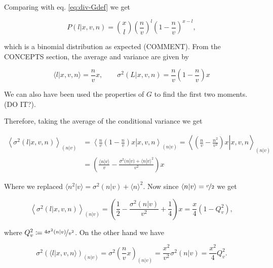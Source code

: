 Comparing with eq. \eqref{eq:div-Gdef} we get

\begin{equation}
  P(l|x,v,n) = {x\choose l}\left(\frac{n}{v}\right)^l\left(1-\frac{n}{v}\right)^{x-l},
\end{equation}

which is a binomial distribution as expected (COMMENT). From the CONCEPTS section, the average and variance are given by

\begin{equation}
  \langle l|x,v,n\rangle = \frac{n}{v}x, \quad\quad \sigma^2(L|x,v,n) = \frac{n}{v}\left(1-\frac{n}{v}\right)x
\end{equation}

We can also have been used the properties of $G$ to find the first two moments. (DO IT?).

Therefore, taking the average of the conditional variance we get

\begin{equation}
  \begin{split}
    \left\langle\sigma^2(l|x,v,n)\right\rangle_{(n|v)} &= \left\langle\left.\frac{n}{v}\left(1-\frac{n}{v}\right)x\right|x,v,n\right\rangle_{(n|v)} = \left\langle\left.\left(\frac{n}{v}-\frac{n^2}{v^2}\right)x\right|x,v,n\right\rangle_{(n|v)}\\
    &= \left(\frac{\langle n|v\rangle}{v}-\frac{\sigma^2(n|v) + \langle n|v\rangle^2}{v^2}\right)x
  \end{split}
\end{equation}

Where we replaced $\langle n^2|v\rangle = \sigma^2(n|v) + \langle n\rangle^2$. Now since $\langle n|v\rangle = \nicefrac{v}{2}$ we get

\begin{equation}
  \label{eq:div-varofavel}
  \left\langle\sigma^2(l|x,v,n)\right\rangle_{(n|v)} = \left(\frac{1}{2} - \frac{\sigma^2(n|v)}{v^2} + \frac{1}{4}\right)x = \frac{x}{4}\left(1-Q_v^2\right),
\end{equation}

where $Q_v^2 \coloneqq \nicefrac{4\sigma^2(n|v)}{v^2}$. On the other hand we have

\begin{equation}
  \label{eq:div-aveofvarl}
  \sigma^2\left(\langle l|x,v,n\rangle\right)_{(n|v)} = \sigma^2\left(\frac{n}{v}x\right)_{(n|v)} = \frac{x^2}{v^2}\sigma^2(n|v) = \frac{x^2}{4}Q_v^2.
\end{equation}

